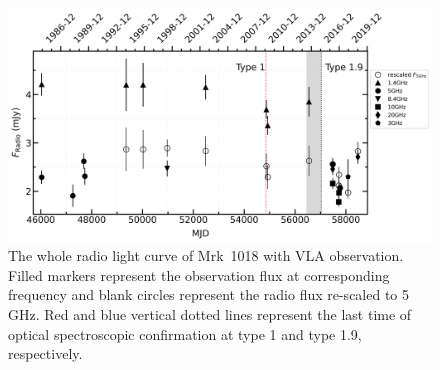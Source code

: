 \documentclass[twocolumn]{aastex63}
\begin{document}
\begin{figure}
\centering
	\includegraphics[width=\textwidth]{./pic/subplots-radio-second_freq.png}
    \caption{The whole radio light curve of Mrk~1018 with VLA observation. Filled markers represent the observation flux at corresponding frequency and blank circles represent the radio flux re-scaled to 5 GHz. Red and blue vertical dotted lines represent the last time of optical spectroscopic confirmation at type 1 and type 1.9, respectively.}
    \label{fig:radio-lc}
\end{figure}
\end{document}
